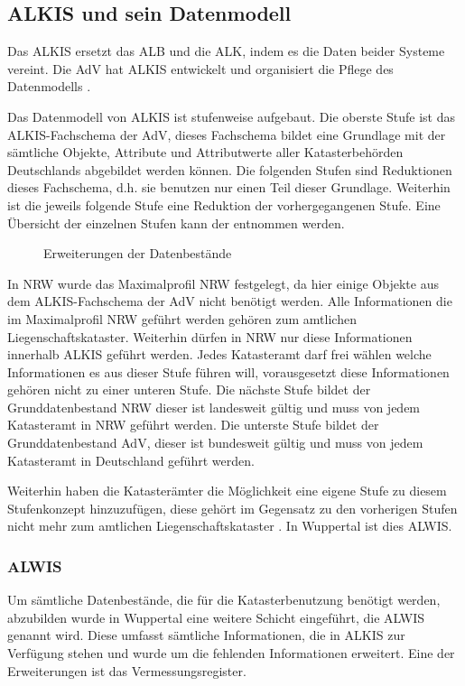 \subsection{ALKIS und sein Datenmodell}
Das \acf{ALKIS} ersetzt das \acf{ALB} und die \acf{ALK}, indem es die Daten beider Systeme vereint. Die \acs{AdV} hat \acs{ALKIS} entwickelt und organisiert die Pflege des Datenmodells \autocite[vgl.][]{adv-alkis}.

Das Datenmodell von ALKIS ist stufenweise aufgebaut. Die oberste Stufe ist das ALKIS-Fachschema der AdV, dieses Fachschema bildet eine Grundlage mit der sämtliche Objekte, Attribute und Attributwerte aller Katasterbehörden Deutschlands abgebildet werden können.
Die folgenden Stufen sind Reduktionen dieses Fachschema, d.h. sie benutzen nur einen Teil dieser Grundlage. Weiterhin ist die jeweils folgende Stufe eine Reduktion der vorhergegangenen Stufe. Eine Übersicht der einzelnen Stufen kann der  entnommen werden. 

\begin{figure}[htbp]
	\centering
	\caption{Erweiterungen der Datenbestände}
	\label{fig:prod-stufen}
\end{figure}

In \ac{NRW} wurde das Maximalprofil NRW festgelegt, da hier einige Objekte aus dem ALKIS-Fachschema der AdV nicht benötigt werden. Alle Informationen die im Maximalprofil NRW geführt werden gehören zum amtlichen Liegenschaftskataster.
Weiterhin dürfen in NRW nur diese Informationen innerhalb ALKIS geführt werden. Jedes Katasteramt darf frei wählen welche Informationen es aus dieser Stufe führen will, vorausgesetzt diese Informationen gehören nicht zu einer unteren Stufe.
Die nächste Stufe bildet der Grunddatenbestand NRW dieser ist landesweit gültig und muss von jedem Katasteramt in NRW geführt werden.
Die unterste Stufe bildet der Grunddatenbestand AdV, dieser ist bundesweit gültig und muss von jedem Katasteramt in Deutschland geführt werden.

Weiterhin haben die Katasterämter die Möglichkeit eine eigene Stufe zu diesem Stufenkonzept hinzuzufügen, diese gehört im Gegensatz zu den vorherigen Stufen nicht mehr zum amtlichen Liegenschaftskataster \autocite[vgl.][1-4]{bezk-grunddaten}. In Wuppertal ist dies \acs{ALWIS}.

\subsubsection{ALWIS}
Um sämtliche Datenbestände, die für die Katasterbenutzung benötigt werden, abzubilden wurde in Wuppertal eine weitere Schicht eingeführt, die \acf{ALWIS} genannt wird.
Diese umfasst sämtliche Informationen, die in ALKIS zur Verfügung stehen und wurde um die fehlenden Informationen erweitert.
Eine der Erweiterungen ist das Vermessungsregister.


